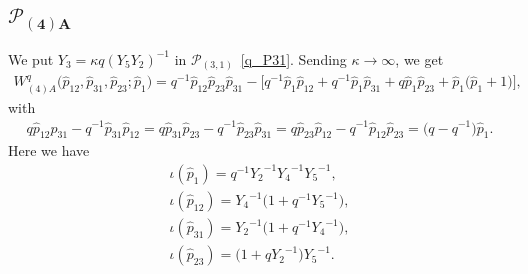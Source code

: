 \documentclass[10pt,a4paper]{amsart}
\numberwithin{equation}{section}
\begin{document}
\subsection[$\mathcal{P}_{(4)A}$]{$\boldsymbol{\mathcal{P}_{(4)A}}$}
We put $Y_3 = \kappa q (Y_5 Y_2)^{-1}$ in $\mathcal{P}_{(3,1)}$~\eqref{q_P31}. Sending $\kappa\to\infty$, we get
\begin{gather*}
 W^q_{(4)A}\big( \hat{p}_{12}, \hat{p}_{31}, \hat{p}_{23}; \hat{p}_1 \big)
 = q^{-1} \hat{p}_{12} \hat{p}_{23} \hat{p}_{31} - \big[ q^{-1} \hat{p}_1 \hat{p}_{12} + q^{-1} \hat{p}_1 \hat{p}_{31} + q \hat{p}_1 \hat{p}_{23} + \hat{p}_1 \big( \hat{p}_1 + 1\big)\big] ,
\end{gather*}
with
\begin{gather*}
 q \hat{p}_{12} \hat{p}_{31} - q^{-1} \hat{p}_{31} \hat{p}_{12} = q \hat{p}_{31} \hat{p}_{23} - q^{-1} \hat{p}_{23} \hat{p}_{31} = q \hat{p}_{23} \hat{p}_{12} - q^{-1} \hat{p}_{12} \hat{p}_{23}
= \big( q - q^{-1}\big) \hat{p}_1 .
\end{gather*}
Here we have
\begin{gather}
 \iota(\hat{p}_1) = q^{-1} {Y_2}^{-1}{Y_4}^{-1}{Y_5}^{-1} ,\nonumber \\
\iota(\hat{p}_{12}) = {Y_4}^{-1} \big( 1 + q^{-1} {Y_5}^{-1}\big) , \nonumber\\
 \iota(\hat{p}_{31}) = {Y_2}^{-1}\big( 1 + q^{-1} {Y_4}^{-1}\big) , \nonumber\\
 \iota(\hat{p}_{23}) =\big( 1 + q {Y_2}^{-1}\big) {Y_5}^{-1} . \label{q_P4A}
\end{gather}
\end{document}
